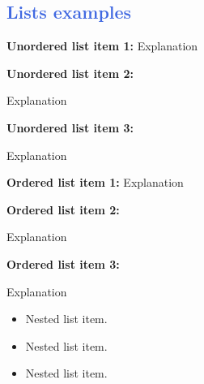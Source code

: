 \documentclass[10pt,landscape,a4paper]{article}
\begin{document}
\begin{multicols*}{3}
\textcolor{RoyalBlue}{\subsection*{Lists examples}}
\begin{itemize}
\item \textcolor{Mulberry}{\textbf{Unordered list item 1:}}  Explanation
\textcolor{Mulberry}{\item \textbf{Unordered list item 2:}}  Explanation
\textcolor{Mulberry}{\item \textbf{Unordered list item 3:}}  Explanation
\end{itemize}
\lipsum[1-1]
\begin{enumerate}
\item \textcolor{Mulberry}{\textbf{Ordered list item 1:}}  Explanation
\textcolor{Mulberry}{\item \textbf{Ordered list item 2:}}  Explanation
\textcolor{Mulberry}{\item \textbf{Ordered list item 3:}}  Explanation
\begin{itemize}
\item Nested list item.
\item Nested list item.
\item Nested list item.
\end{itemize}
\end{enumerate}



\end{multicols*}
\end{document}
